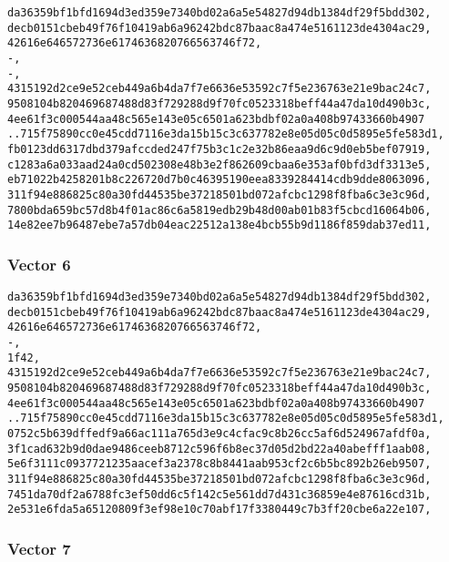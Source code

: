 \documentclass[
]{article}
\begin{document}
\begin{verbatim}
da36359bf1bfd1694d3ed359e7340bd02a6a5e54827d94db1384df29f5bdd302,
decb0151cbeb49f76f10419ab6a96242bdc87baac8a474e5161123de4304ac29,
42616e646572736e6174636820766563746f72,
-,
-,
4315192d2ce9e52ceb449a6b4da7f7e6636e53592c7f5e236763e21e9bac24c7,
9508104b820469687488d83f729288d9f70fc0523318beff44a47da10d490b3c,
4ee61f3c000544aa48c565e143e05c6501a623bdbf02a0a408b97433660b4907
..715f75890cc0e45cdd7116e3da15b15c3c637782e8e05d05c0d5895e5fe583d1,
fb0123dd6317dbd379afccded247f75b3c1c2e32b86eaa9d6c9d0eb5bef07919,
c1283a6a033aad24a0cd502308e48b3e2f862609cbaa6e353af0bfd3df3313e5,
eb71022b4258201b8c226720d7b0c46395190eea8339284414cdb9dde8063096,
311f94e886825c80a30fd44535be37218501bd072afcbc1298f8fba6c3e3c96d,
7800bda659bc57d8b4f01ac86c6a5819edb29b48d00ab01b83f5cbcd16064b06,
14e82ee7b96487ebe7a57db04eac22512a138e4bcb55b9d1186f859dab37ed11,
\end{verbatim}

\hypertarget{vector-6-1}{%
\subsubsection{Vector 6}\label{vector-6-1}}

\begin{verbatim}
da36359bf1bfd1694d3ed359e7340bd02a6a5e54827d94db1384df29f5bdd302,
decb0151cbeb49f76f10419ab6a96242bdc87baac8a474e5161123de4304ac29,
42616e646572736e6174636820766563746f72,
-,
1f42,
4315192d2ce9e52ceb449a6b4da7f7e6636e53592c7f5e236763e21e9bac24c7,
9508104b820469687488d83f729288d9f70fc0523318beff44a47da10d490b3c,
4ee61f3c000544aa48c565e143e05c6501a623bdbf02a0a408b97433660b4907
..715f75890cc0e45cdd7116e3da15b15c3c637782e8e05d05c0d5895e5fe583d1,
0752c5b639dffedf9a66ac111a765d3e9c4cfac9c8b26cc5af6d524967afdf0a,
3f1cad632b9d0dae9486ceeb8712c596f6b8ec37d05d2bd22a40abefff1aab08,
5e6f3111c0937721235aacef3a2378c8b8441aab953cf2c6b5bc892b26eb9507,
311f94e886825c80a30fd44535be37218501bd072afcbc1298f8fba6c3e3c96d,
7451da70df2a6788fc3ef50dd6c5f142c5e561dd7d431c36859e4e87616cd31b,
2e531e6fda5a65120809f3ef98e10c70abf17f3380449c7b3ff20cbe6a22e107,
\end{verbatim}

\hypertarget{vector-7-1}{%
\subsubsection{Vector 7}\label{vector-7-1}}
\end{document}
